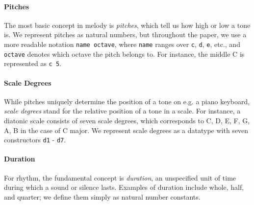 \paragraph{Pitches}

The most basic concept in melody is \emph{pitches}, which tell us
how high or low a tone is.
We represent pitches as natural numbers, but throughout the paper,
we use a more readable notation \texttt{name octave}, where
\texttt{name} ranges over \texttt{c}, \texttt{d}, \texttt{e}, etc.,
and \texttt{octave} denotes which octave the pitch belongs to.
For instance, the middle C is represented as \texttt{c 5}.




\paragraph{Scale Degrees}

While pitches uniquely determine the position of a tone on e.g.
a piano keyboard, \emph{scale degrees} stand for the relative position
of a tone in a scale.
For instance, a diatonic scale consists of seven scale degrees, which
corresponds to C, D, E, F, G, A, B in the case of C major.
We represent scale degrees as a datatype with seven constructors
\texttt{d1} - \texttt{d7}.

\paragraph{Duration}

For rhythm, the fundamental concept is \emph{duration}, an
unspecified unit of time during which a sound or silence lasts.
Examples of duration include whole, half, and quarter;
we define them simply as natural number constants.



